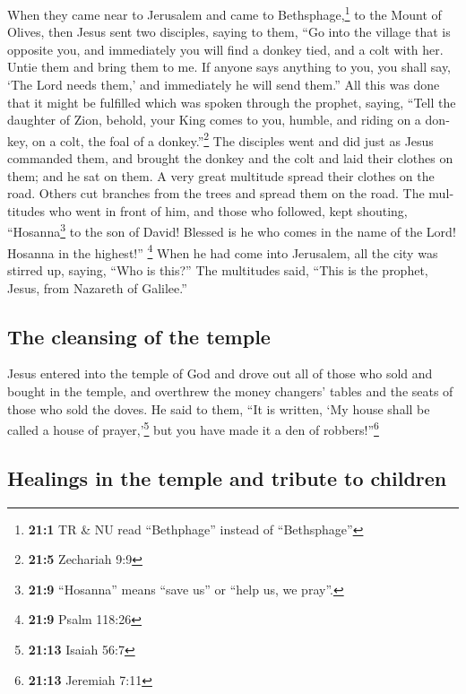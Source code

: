 \begin{paracol}{2}
\begin{otherlanguage}{english}
 When they came near to Jerusalem and came to
Bethsphage,\footnote{\textbf{21:1} TR \& NU read ``Bethphage'' instead
  of ``Bethsphage''} to the Mount of Olives, then Jesus sent two
disciples,  saying to them, ``Go into the village that is
opposite you, and immediately you will find a donkey tied, and a colt
with her. Untie them and bring them to me.  If anyone says
anything to you, you shall say, `The Lord needs them,' and immediately
he will send them.''  All this was done that it might be
fulfilled which was spoken through the prophet, saying, 
``Tell the daughter of Zion, behold, your King comes to you, humble, and
riding on a donkey, on a colt, the foal of a donkey.''\footnote{\textbf{21:5}
  Zechariah 9:9}  The disciples went and did just as Jesus
commanded them,  and brought the donkey and the colt and
laid their clothes on them; and he sat on them.  A very
great multitude spread their clothes on the road. Others cut branches
from the trees and spread them on the road.  The
multitudes who went in front of him, and those who followed, kept
shouting, ``Hosanna\footnote{\textbf{21:9} ``Hosanna'' means ``save us''
  or ``help us, we pray''.} to the son of David! Blessed is he who comes
in the name of the Lord! Hosanna in the highest!'' \footnote{\textbf{21:9}
  Psalm 118:26}  When he had come into Jerusalem, all the
city was stirred up, saying, ``Who is this?''  The
multitudes said, ``This is the prophet, Jesus, from Nazareth of
Galilee.''

\hypertarget{the-cleansing-of-the-temple}{%
\subsection{The cleansing of the
temple}\label{the-cleansing-of-the-temple}}

 Jesus entered into the temple of God and drove out all
of those who sold and bought in the temple, and overthrew the money
changers' tables and the seats of those who sold the doves.
 He said to them, ``It is written, `My house shall be
called a house of prayer,'\footnote{\textbf{21:13} Isaiah 56:7} but you
have made it a den of robbers!''\footnote{\textbf{21:13} Jeremiah 7:11}

\hypertarget{healings-in-the-temple-and-tribute-to-children}{%
\subsection{Healings in the temple and tribute to
children}\label{healings-in-the-temple-and-tribute-to-children}}


\end{otherlanguage}
\end{paracol}
